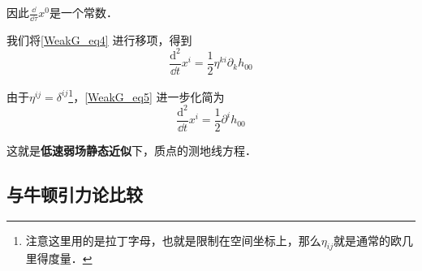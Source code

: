 因此$\frac{\dd}{\dd\tau}x^0$是一个常数．

我们将\autoref{WeakG_eq4} 进行移项，得到
\begin{equation}\label{WeakG_eq5}
\frac{\mathrm{d}^2}{\dd t}x^i=\frac{1}{2}\eta^{ki}\partial_kh_{00}
\end{equation}

由于$\eta^{ij}=\delta^{ij}$\footnote{注意这里用的是拉丁字母，也就是限制在空间坐标上，那么$\eta_{ij}$就是通常的欧几里得度量．}，\autoref{WeakG_eq5} 进一步化简为
\begin{equation}
\frac{\mathrm{d}^2}{\dd t}x^i=\frac{1}{2}\partial^ih_{00}
\end{equation}

这就是\textbf{低速弱场静态近似}下，质点的测地线方程．

\subsection{与牛顿引力论比较}













